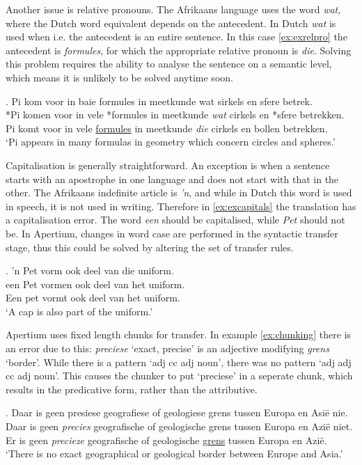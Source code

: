 \documentclass[11pt]{article}
\begin{document}
Another issue is relative pronouns. The Afrikaans language uses the word {\em wat}, where the
Dutch word equivalent depends on the antecedent. In Dutch {\em wat} is used when i.e. the antecedent
is an entire sentence. In this case \ref{ex:exrelpro} the antecedent is {\em formules}, for which the appropriate
relative pronoun is {\em die}. Solving this problem requires the ability to analyse the
sentence on a semantic level, which means it is unlikely to be solved anytime soon.

\ex. \label{ex:exrelpro}
    Pi kom voor in baie formules in meetkunde wat sirkels en sfere betrek. \\
    *Pi komen voor in vele *formules in meetkunde {\em wat} cirkels en *sfere betrekken. \\
    Pi komt voor in vele \underline{formules} in meetkunde {\em die} cirkels en bollen betrekken. \\
    `Pi appears in many formulas in geometry which concern circles and spheres.' 

Capitalisation is generally straightforward. An exception is when a sentence
starts with an apostrophe in one language and does not start with that in the other. The Afrikaans
indefinite article is \emph{'n}, and while in Dutch this word is used in speech, it is 
not used in writing. Therefore in \ref{ex:excapitals} the translation has a 
capitalisation error. The word \emph{een} should be capitalised, while \emph{Pet} should not 
be. In Apertium, changes in word case are performed in the syntactic transfer stage, thus this 
could be solved by altering the set of transfer rules.

\ex. \label{ex:excapitals} 
    'n Pet vorm ook deel van die uniform. \\
    een Pet vormen ook deel van het uniform. \\
    Een pet vormt ook deel van het uniform. \\
    `A cap is also part of the uniform.' 

Apertium uses fixed length chunks for transfer. In example \ref{ex:chunking} there is an error
due to this: \emph{preciese} `exact, precise' is an adjective modifying \emph{grens} `border'. While 
there is a pattern
`adj cc adj noun', there was no pattern `adj adj cc adj noun'. This causes the chunker to put
`preciese' in a seperate chunk, which results in the predicative form, rather than the attributive.

\ex. \label{ex:chunking}
    Daar is geen presiese geografiese of geologiese grens tussen Europa en Asië nie. \\
    Daar is geen {\em precies} geografische of geologische grens tussen Europa en Azië niet. \\ 
    Er is geen {\em precieze} geografische of geologische \underline{grens} tussen Europa en Azië. \\
    `There is no exact geographical or geological border between Europe and Asia.' 
\end{document}
